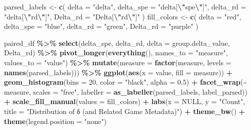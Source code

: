 \documentclass[
]{article}
\newenvironment{Shaded}{\begin{snugshade}}{\end{snugshade}}
\newcommand{\AttributeTok}[1]{\textcolor[rgb]{0.13,0.29,0.53}{#1}}
\newcommand{\ConstantTok}[1]{\textcolor[rgb]{0.56,0.35,0.01}{#1}}
\newcommand{\DecValTok}[1]{\textcolor[rgb]{0.00,0.00,0.81}{#1}}
\newcommand{\FloatTok}[1]{\textcolor[rgb]{0.00,0.00,0.81}{#1}}
\newcommand{\FunctionTok}[1]{\textcolor[rgb]{0.13,0.29,0.53}{\textbf{#1}}}
\newcommand{\NormalTok}[1]{#1}
\newcommand{\OtherTok}[1]{\textcolor[rgb]{0.56,0.35,0.01}{#1}}
\newcommand{\SpecialCharTok}[1]{\textcolor[rgb]{0.81,0.36,0.00}{\textbf{#1}}}
\newcommand{\StringTok}[1]{\textcolor[rgb]{0.31,0.60,0.02}{#1}}
\begin{document}
\begin{Shaded}
\begin{Highlighting}[]
\NormalTok{parsed\_labels }\OtherTok{\textless{}{-}} \FunctionTok{c}\NormalTok{(}
  \AttributeTok{delta      =} \StringTok{"delta"}\NormalTok{,}
  \AttributeTok{delta\_spe  =} \StringTok{"delta[}\SpecialCharTok{\textbackslash{}"}\StringTok{spe}\SpecialCharTok{\textbackslash{}"}\StringTok{]"}\NormalTok{,}
  \AttributeTok{delta\_rd   =} \StringTok{"delta[}\SpecialCharTok{\textbackslash{}"}\StringTok{rd}\SpecialCharTok{\textbackslash{}"}\StringTok{]"}\NormalTok{,}
  \AttributeTok{Delta\_rd   =} \StringTok{"Delta[}\SpecialCharTok{\textbackslash{}"}\StringTok{rd}\SpecialCharTok{\textbackslash{}"}\StringTok{]"}
\NormalTok{)}
\NormalTok{fill\_colors }\OtherTok{\textless{}{-}} \FunctionTok{c}\NormalTok{(}
  \AttributeTok{delta      =} \StringTok{"red"}\NormalTok{,}
  \AttributeTok{delta\_spe  =} \StringTok{"blue"}\NormalTok{,}
  \AttributeTok{delta\_rd   =} \StringTok{"green"}\NormalTok{,}
  \AttributeTok{Delta\_rd   =} \StringTok{"purple"}
\NormalTok{)}

\NormalTok{paired\_df }\SpecialCharTok{\%\textgreater{}\%}
  \FunctionTok{select}\NormalTok{(delta\_spe, delta\_rd, }\AttributeTok{delta =}\NormalTok{ group.delta\_value, Delta\_rd) }\SpecialCharTok{\%\textgreater{}\%}
  \FunctionTok{pivot\_longer}\NormalTok{(}\FunctionTok{everything}\NormalTok{(), }\AttributeTok{names\_to =} \StringTok{"measure"}\NormalTok{, }\AttributeTok{values\_to =} \StringTok{"value"}\NormalTok{) }\SpecialCharTok{\%\textgreater{}\%}
  \FunctionTok{mutate}\NormalTok{(}\AttributeTok{measure =} \FunctionTok{factor}\NormalTok{(measure, }\AttributeTok{levels =} \FunctionTok{names}\NormalTok{(parsed\_labels))) }\SpecialCharTok{\%\textgreater{}\%}
  \FunctionTok{ggplot}\NormalTok{(}\FunctionTok{aes}\NormalTok{(}\AttributeTok{x =}\NormalTok{ value, }\AttributeTok{fill =}\NormalTok{ measure)) }\SpecialCharTok{+}
  \FunctionTok{geom\_histogram}\NormalTok{(}\AttributeTok{bins =} \DecValTok{20}\NormalTok{, }\AttributeTok{color =} \StringTok{"black"}\NormalTok{, }\AttributeTok{alpha =} \FloatTok{0.5}\NormalTok{) }\SpecialCharTok{+}
  \FunctionTok{facet\_wrap}\NormalTok{(}\SpecialCharTok{\textasciitilde{}}\NormalTok{ measure, }\AttributeTok{scales =} \StringTok{"free"}\NormalTok{, }\AttributeTok{labeller =} \FunctionTok{as\_labeller}\NormalTok{(parsed\_labels, label\_parsed)) }\SpecialCharTok{+}
  \FunctionTok{scale\_fill\_manual}\NormalTok{(}\AttributeTok{values =}\NormalTok{ fill\_colors) }\SpecialCharTok{+}
  \FunctionTok{labs}\NormalTok{(}\AttributeTok{x =} \ConstantTok{NULL}\NormalTok{, }\AttributeTok{y =} \StringTok{"Count"}\NormalTok{, }\AttributeTok{title =} \StringTok{"Distribution of δ (and Related Game Metadata)"}\NormalTok{) }\SpecialCharTok{+}
  \FunctionTok{theme\_bw}\NormalTok{() }\SpecialCharTok{+}
  \FunctionTok{theme}\NormalTok{(}\AttributeTok{legend.position =} \StringTok{"none"}\NormalTok{)}
\end{Highlighting}
\end{Shaded}
\end{document}
